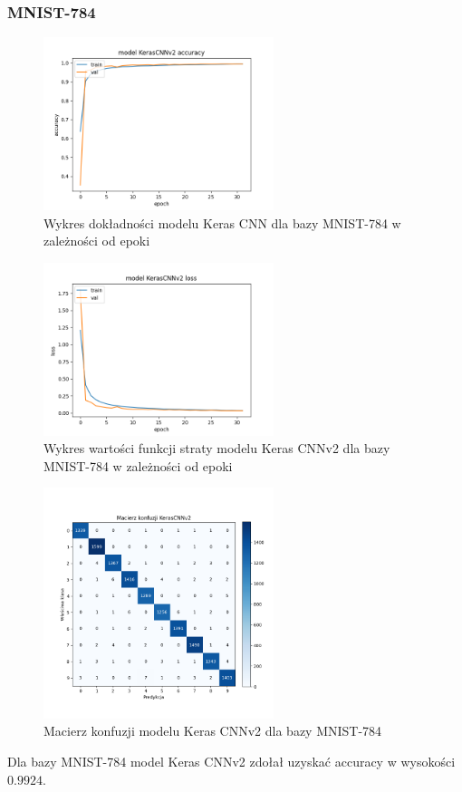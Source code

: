 \documentclass{article}
\begin{document}
\subsubsection{MNIST-784}
\begin{figure}[H]
    \centering
    \includegraphics[width=0.6\textwidth]{../Saves/KerasCNNV2/mnist-784/KerasCNNV2_mnist_784_ep32_acc.png}
    \caption{Wykres dokładności modelu Keras CNN dla bazy MNIST-784 w zależności od epoki}
\end{figure}

\begin{figure}[H]
    \centering
    \includegraphics[width=0.6\textwidth]{../Saves/KerasCNNV2/mnist-784/KerasCNNV2_mnist_784_ep32_loss.png}
    \caption{Wykres wartości funkcji straty modelu Keras CNNv2 dla bazy MNIST-784 w zależności od epoki} 
\end{figure}

\begin{figure}[H]
	\centering
	\includegraphics[width=0.6\textwidth]{../Saves/KerasCNNV2/mnist-784/KerasCNNV2_mnist_784_conf_mat.png}
	\caption{Macierz konfuzji modelu Keras CNNv2 dla bazy MNIST-784}
\end{figure}
Dla bazy MNIST-784 model Keras CNNv2 zdołał uzyskać accuracy w wysokości $0.9924$.
\end{document}
